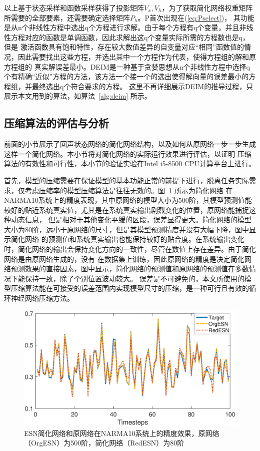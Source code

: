 以上基于状态采样和函数采样获得了投影矩阵\(V_x,V_h\)，为了获取简化网络权重矩阵所需要的全部要素，还需要确定选择矩阵\(P_h\)。P首次出现在(\ref{eq:Pselect})，
其功能是从n个非线性方程中选出q个方程进行求解。由于每个方程有q个变量，并且非线性方程对应的函数是单调函数，因此求解出这q个变量实际所需的方程数也是q，但是
激活函数具有饱和特性，存在较大数值差异的自变量对应“相同”函数值的情况，因此需要找出这些方程，并选出其中一个方程作为代表，使得方程组的解和原方程组的
真实解误差最小。DEIM是一种基于贪婪思想从n个非线性方程中选择q个有精确“近似”方程的方法，该方法一个接一个的选出使得解向量的误差最小的方程组，并最终选出q个符合要求的方程。
这里不再详细展示DEIM的推导过程，只展示本文用到的算法，如算法~\ref{alg:deim} 所示。
\subsection{压缩算法的评估与分析}
前面的小节展示了回声状态网络的简化网络结构，以及如何从原网络一步一步生成这样一个简化网络。本小节将对简化网络的实际运行效果进行评估，以证明
压缩算法的有效性和可行性，本小节的验证实验在Intel i5-8500 CPU计算平台上进行。

首先，模型的压缩需要在保证模型的基本功能正常的前提下进行，脱离任务实际需求，仅考虑压缩率的模型压缩算法是往往无效的。图~\ref{fig:accuracy} 所示为简化网络
在NARMA10系统上的精度表现，其中原网络的模型大小为500阶，其模型预测值能较好的贴近系统真实值，尤其是在系统真实输出剧烈变化的位置，原网络能捕捉这种动态信息，
但是相对于其他变化平缓的区段，误差显得更大。简化网络的模型大小为80阶，远小于原网络的尺寸，但是其模型预测精度并没有大幅下降，图中显示简化网络
的预测值和系统真实输出也能保持较好的贴合度。在系统输出变化时，简化网络的输出会保持变化方向的一致性，尽管在数值上存在差异。由于简化网络是由原网络生成的，没有
在数据集上训练，因此原网络的精度是决定简化网络预测效果的直接因素，图中显示，简化网络的预测值和原网络的预测值在多数情况下能保持一致，除了个别位置波动较大。
误差是不可避免的，本文所使用的模型压缩算法能在可接受的误差范围内实现模型尺寸的压缩，是一种可行且有效的循环神经网络压缩方法。
\begin{figure}
	\centering
	\includegraphics[width=1.0\columnwidth]{exp/500&80_all.eps}
	\caption{ESN简化网络和原网络在NARMA10系统上的精度效果，原网络（OrgESN）为500阶，简化网络（RedESN）为80阶}
	\label{fig:accuracy}
\end{figure}

